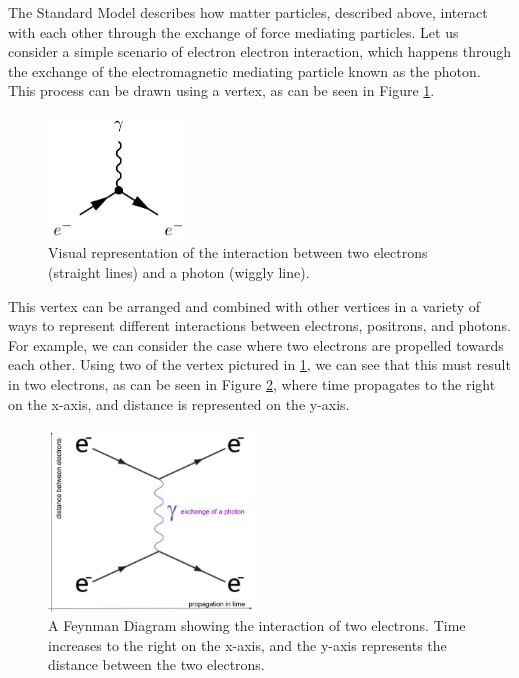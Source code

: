 The Standard Model describes how matter particles, described above, interact with each other through the exchange of force mediating particles. Let us consider a simple scenario of electron electron interaction, which happens through the exchange of the electromagnetic mediating particle known as the photon. This process can be drawn using a vertex, as can be seen in Figure \ref{Fig:Intro:Vertex1}. 
\begin{figure}[h]
    \centering
        \includegraphics[width=0.33\textwidth]{F1/Vertex1}
        \caption{Visual representation of the interaction between two electrons (straight lines) and a photon (wiggly line).}
        \label{Fig:Intro:Vertex1}
\end{figure}
This vertex can be arranged and combined with other vertices in a variety of ways to represent different interactions between electrons, positrons, and photons. For example, we can consider the case where two electrons are propelled towards each other. Using two of the vertex pictured in \ref{Fig:Intro:Vertex1}, we can see that this must result in two electrons, as can be seen in Figure \ref{Fig:Intro:Feynman1}, where time propagates to the right on the x-axis, and distance is represented on the y-axis. 
\begin{figure}[h]
    \centering
        \includegraphics[width=0.49\textwidth]{F1/FeynDiag1}
        \caption{A Feynman Diagram showing the interaction of two electrons. Time increases to the right on the x-axis, and the y-axis represents the distance between the two electrons.}
        \label{Fig:Intro:Feynman1}
\end{figure}
